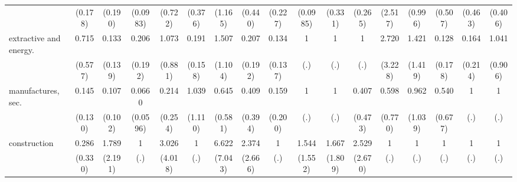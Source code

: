 {\begin{tabular}{l*{16}{c}}
                    &     (0.178)         &     (0.190)         &    (0.0983)         &     (0.722)         &     (0.376)         &     (1.165)         &     (0.440)         &     (0.227)         &    (0.0985)         &     (0.331)         &     (0.265)         &     (2.517)         &     (0.996)         &     (0.507)         &     (0.463)         &     (0.406)         \\
[1em]
extractive and energy.&       0.715         &       0.133         &       0.206         &       1.073         &       0.191\sym{*}  &       1.507         &       0.207         &       0.134\sym{*}  &           1         &           1         &           1         &       2.720         &       1.421         &       0.128         &       0.164         &       1.041         \\
                    &     (0.577)         &     (0.139)         &     (0.192)         &     (0.881)         &     (0.158)         &     (1.104)         &     (0.192)         &     (0.137)         &         (.)         &         (.)         &         (.)         &     (3.228)         &     (1.419)         &     (0.178)         &     (0.214)         &     (0.906)         \\
[1em]
manufactures, sec.  &       0.145\sym{*}  &       0.107\sym{*}  &      0.0660\sym{**} &       0.214         &       1.039         &       0.645         &       0.409         &       0.159         &           1         &           1         &       0.407         &       0.598         &       0.962         &       0.540         &           1         &           1         \\
                    &     (0.130)         &     (0.102)         &    (0.0596)         &     (0.254)         &     (1.110)         &     (0.581)         &     (0.394)         &     (0.200)         &         (.)         &         (.)         &     (0.473)         &     (0.770)         &     (1.039)         &     (0.677)         &         (.)         &         (.)         \\
[1em]
construction        &       0.286         &       1.789         &           1         &       3.026         &           1         &       6.622         &       2.374         &           1         &       1.544         &       1.667         &       2.529         &           1         &           1         &           1         &           1         &           1         \\
                    &     (0.330)         &     (2.191)         &         (.)         &     (4.018)         &         (.)         &     (7.043)         &     (2.666)         &         (.)         &     (1.552)         &     (1.809)         &     (2.670)         &         (.)         &         (.)         &         (.)         &         (.)         &         (.)         \\

\end{tabular}}
